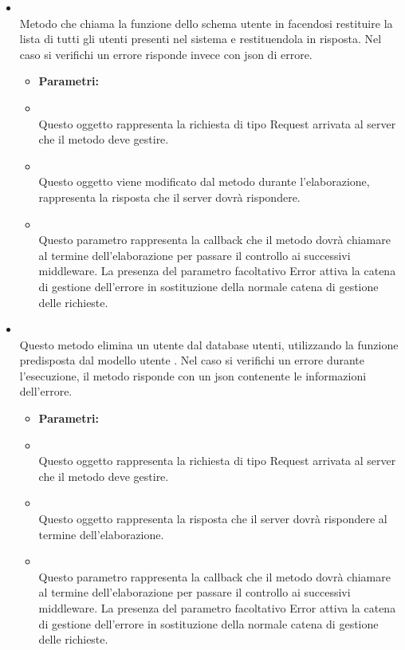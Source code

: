 \begin{itemize}
\item[] \textbf{} \\ Metodo che chiama la funzione  dello schema utente in  facendosi restituire la lista di tutti gli utenti presenti nel sistema e restituendola in risposta. Nel caso si verifichi un errore risponde invece con json di errore.
\begin{itemize}\addtolength{\itemsep}{-0.5\baselineskip}
\item[] \textbf{Parametri:}
\item[]  \\ Questo oggetto rappresenta la richiesta di tipo Request arrivata al server che il metodo deve gestire.
\item[]  \\ Questo oggetto viene modificato dal metodo durante l'elaborazione, rappresenta la risposta che il server dovrà rispondere.
\item[]  \\ Questo parametro rappresenta la callback che il metodo dovrà chiamare al termine dell'elaborazione per passare il controllo ai successivi middleware. La presenza del parametro facoltativo Error attiva la catena di gestione dell'errore in sostituzione della normale catena di gestione delle richieste.
\end{itemize}
\item[] \textbf{} \\ Questo metodo elimina un utente dal database utenti, utilizzando la funzione predisposta dal modello utente . Nel caso si verifichi un errore durante l'esecuzione, il metodo risponde con un json contenente le informazioni dell'errore.
\begin{itemize}\addtolength{\itemsep}{-0.5\baselineskip}
\item[] \textbf{Parametri:}
\item[]  \\ Questo oggetto rappresenta la richiesta di tipo Request arrivata al server che il metodo deve gestire.
\item[]  \\ Questo oggetto rappresenta la risposta che il server dovrà rispondere al termine dell'elaborazione.
\item[]  \\ Questo parametro rappresenta la callback che il metodo dovrà chiamare al termine dell'elaborazione per passare il controllo ai successivi middleware. La presenza del parametro facoltativo Error attiva la catena di gestione dell'errore in sostituzione della normale catena di gestione delle richieste.

\end{itemize}
\end{itemize}
